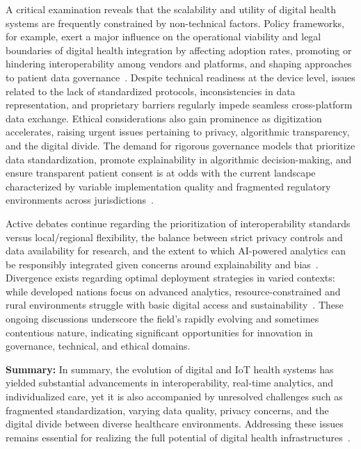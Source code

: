 \documentclass[sigconf]{acmart}
\begin{document}
A critical examination reveals that the scalability and utility of digital health systems are frequently constrained by non-technical factors. Policy frameworks, for example, exert a major influence on the operational viability and legal boundaries of digital health integration by affecting adoption rates, promoting or hindering interoperability among vendors and platforms, and shaping approaches to patient data governance~\cite{ref82,ref90}. Despite technical readiness at the device level, issues related to the lack of standardized protocols, inconsistencies in data representation, and proprietary barriers regularly impede seamless cross-platform data exchange. Ethical considerations also gain prominence as digitization accelerates, raising urgent issues pertaining to privacy, algorithmic transparency, and the digital divide. The demand for rigorous governance models that prioritize data standardization, promote explainability in algorithmic decision-making, and ensure transparent patient consent is at odds with the current landscape characterized by variable implementation quality and fragmented regulatory environments across jurisdictions~\cite{ref82,ref84,ref90,ref106}.

Active debates continue regarding the prioritization of interoperability standards versus local/regional flexibility, the balance between strict privacy controls and data availability for research, and the extent to which AI-powered analytics can be responsibly integrated given concerns around explainability and bias~\cite{ref90}. Divergence exists regarding optimal deployment strategies in varied contexts: while developed nations focus on advanced analytics, resource-constrained and rural environments struggle with basic digital access and sustainability~\cite{ref82,ref84}. These ongoing discussions underscore the field's rapidly evolving and sometimes contentious nature, indicating significant opportunities for innovation in governance, technical, and ethical domains.

\textbf{Summary:} In summary, the evolution of digital and IoT health systems has yielded substantial advancements in interoperability, real-time analytics, and individualized care, yet it is also accompanied by unresolved challenges such as fragmented standardization, varying data quality, privacy concerns, and the digital divide between diverse healthcare environments. Addressing these issues remains essential for realizing the full potential of digital health infrastructures~\cite{ref82,ref84,ref90,ref106}.
\end{document}
